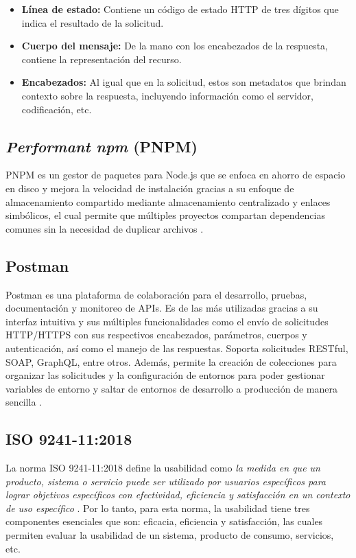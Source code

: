 \begin{itemize}
    \item \textbf{Línea de estado:} Contiene un código de estado HTTP de tres dígitos que indica el resultado de la solicitud.
    \item \textbf{Cuerpo del mensaje:} De la mano con los encabezados de la respuesta, contiene la representación del recurso.
    \item \textbf{Encabezados:} Al igual que en la solicitud, estos son metadatos que brindan contexto sobre la respuesta,
            incluyendo información como el servidor, codificación, etc.
\end{itemize}

\subsection{\textit{Performant npm} (PNPM)}
PNPM es un gestor de paquetes para Node.js que se enfoca en ahorro de espacio en disco y mejora la velocidad de instalación
gracias a su enfoque de almacenamiento compartido mediante almacenamiento centralizado y enlaces simbólicos, el cual permite 
que múltiples proyectos compartan dependencias comunes sin la necesidad de duplicar archivos \cite{pnpm2025motivation}.

\subsection{Postman}
Postman es una plataforma de colaboración para el desarrollo, pruebas, documentación y monitoreo de APIs. Es de las más utilizadas
gracias a su interfaz intuitiva y sus múltiples funcionalidades como el envío de solicitudes HTTP/HTTPS con sus respectivos encabezados,
parámetros, cuerpos y autenticación, así como el manejo de las respuestas. Soporta solicitudes RESTful, SOAP, GraphQL, entre otros.
Además, permite la creación de colecciones para organizar las solicitudes y la configuración de entornos para poder gestionar variables
de entorno y saltar de entornos de desarrollo a producción de manera sencilla \cite{postman2025}.

\subsection{ISO 9241-11:2018}
La norma ISO 9241-11:2018 define la usabilidad como \textit{\guillemetleft{}la medida en que un producto, sistema o servicio puede ser
utilizado por usuarios específicos para lograr objetivos específicos con efectividad, eficiencia y satisfacción en un contexto de uso
específico\guillemetright{}} \cite{ISO9241-11}. Por lo tanto, para esta norma, la usabilidad tiene tres componentes esenciales que son:
eficacia, eficiencia y satisfacción, las cuales permiten evaluar la usabilidad de un sistema, producto de consumo, servicios, etc.

